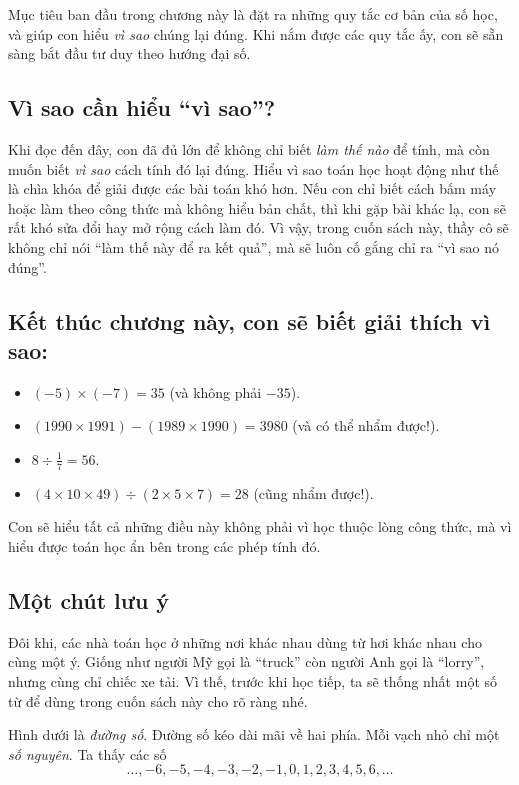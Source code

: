 Mục tiêu ban đầu trong chương này là đặt ra những quy tắc cơ bản của
số học, và giúp con hiểu \emph{vì sao} chúng lại đúng. Khi nắm được
các quy tắc ấy, con sẽ sẵn sàng bắt đầu tư duy theo hướng đại số.

\subsection*{Vì sao cần hiểu “vì sao”?}
Khi đọc đến đây, con đã đủ lớn để không chỉ biết \emph{làm thế nào}
để tính, mà còn muốn biết \emph{vì sao} cách tính đó lại đúng. Hiểu
vì sao toán học hoạt động như thế là chìa khóa để giải được các bài
toán khó hơn. Nếu con chỉ biết cách bấm máy hoặc làm theo công thức mà
không hiểu bản chất, thì khi gặp bài khác lạ, con sẽ rất khó sửa đổi
hay mở rộng cách làm đó. Vì vậy, trong cuốn sách này, thầy cô sẽ không
chỉ nói “làm thế này để ra kết quả”, mà sẽ luôn cố gắng chỉ ra “vì sao
nó đúng”.

\subsection*{Kết thúc chương này, con sẽ biết giải thích vì sao:}
\begin{itemize}
  \item $(-5)\times(-7)=35$ (và không phải $-35$).
  \item $(1990\times1991)-(1989\times1990)=3980$ (và có thể nhẩm được!).
  \item $8\div\tfrac{1}{7}=56$.
  \item $(4\times10\times49)\div(2\times5\times7)=28$ (cũng nhẩm được!).
\end{itemize}

Con sẽ hiểu tất cả những điều này không phải vì học thuộc lòng công
thức, mà vì hiểu được toán học ẩn bên trong các phép tính đó.

\subsection*{Một chút lưu ý}
Đôi khi, các nhà toán học ở những nơi khác nhau dùng từ hơi khác nhau
cho cùng một ý. Giống như người Mỹ gọi là “truck” còn người Anh gọi là
“lorry”, nhưng cùng chỉ chiếc xe tải. Vì thế, trước khi học tiếp, ta
sẽ thống nhất một số từ để dùng trong cuốn sách này cho rõ ràng nhé.


Hình dưới là \emph{đường số}. Đường số kéo dài mãi về hai phía.
Mỗi vạch nhỏ chỉ một \emph{số nguyên}. Ta thấy các số
\[
\ldots,-6,-5,-4,-3,-2,-1,0,1,2,3,4,5,6,\ldots
\]


